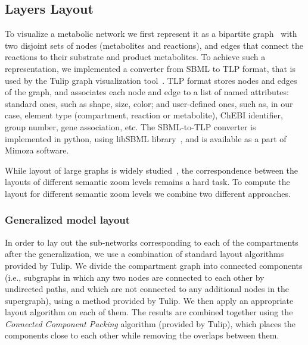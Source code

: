 \documentclass{bmcart}
\begin{document}
\subsection*{Layers Layout}
To visualize a metabolic network we first represent it as a bipartite graph~\cite{Diestel2012} with two disjoint sets of nodes (metabolites and reactions), and edges that connect the reactions to their substrate and product metabolites. To achieve such a representation, we implemented a converter from SBML to TLP format, that is used by the Tulip graph visualization tool~\cite{Auber04}. TLP format stores nodes and edges of the graph, and associates each node and edge to a list of named attributes: standard ones, such as shape, size, color; and user-defined ones, such as, in our case, element type (compartment, reaction or metabolite), ChEBI identifier, group number, gene association, etc. The SBML-to-TLP converter is implemented in python, using libSBML library~\cite{Bornstein2008}, and is available as a part of Mimoza software. 

While layout of large graphs is widely studied~\cite{Unwin2006}, the correspondence between the layouts of different semantic zoom levels remains a hard task. To compute the layout for different semantic zoom levels we combine two different approaches.

\subsubsection*{Generalized model layout}
In order to lay out the sub-networks corresponding to each of the compartments after the generalization, we use a combination of standard layout algorithms provided by Tulip. We divide the compartment graph into connected components (i.e., subgraphs in which any two nodes are connected to each other by undirected paths, and which are not connected to any additional nodes in the supergraph), using a method provided by Tulip. We then apply an appropriate layout algorithm on each of them. The results are combined together using the \emph{Connected Component Packing} algorithm (provided by Tulip), which places the components close to each other while removing the overlaps between them.
\end{document}
